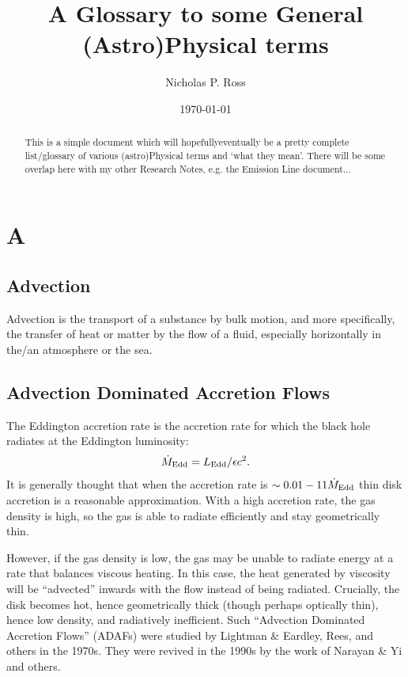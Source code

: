 \documentclass[11pt]{article}
\begin{document}
\title{A Glossary to some General (Astro)Physical terms}
\author{Nicholas P. Ross}
\date{\today}
\maketitle


\begin{abstract}
This is a simple document which will hopefully\/eventually be a pretty
complete list/glossary of various (astro)Physical terms and `what they
mean'. There will be some overlap here with my other Research Notes,
e.g. the Emission Line document...
\end{abstract}



\section*{A}
\subsection*{Advection}
Advection is the transport of a substance by bulk motion, 
and more specifically, the transfer of heat or matter by the flow of a fluid,
especially horizontally in the/an atmosphere or the sea.

\subsection*{Advection Dominated Accretion Flows}
The Eddington accretion rate is the accretion rate for which the black
hole radiates at the Eddington luminosity:
\begin{equation} 
    \dot{M}_{\rm Edd} = L_{\rm Edd} /\epsilon c^{2}.
\end{equation} 
It is generally thought that when the accretion rate is $\sim0.01-11
\dot{M}_{\rm Edd}$ thin disk accretion is a reasonable approximation.
With a high accretion rate, the gas density is high, so the gas is
able to radiate efficiently and stay geometrically thin.

However, if the gas density is low, the gas may be unable to radiate
energy at a rate that balances viscous heating.  In this case, the
heat generated by viscosity will be ``advected'' inwards with the flow
instead of being radiated. Crucially, the disk becomes hot, hence geometrically
thick (though perhaps optically thin), hence low density, and
radiatively inefficient.  Such ``Advection Dominated Accretion Flows''
(ADAFs) were studied by Lightman \& Eardley, Rees, and others in the
1970s. They were revived in the 1990s by the work of Narayan \& Yi and
others.
\end{document}
